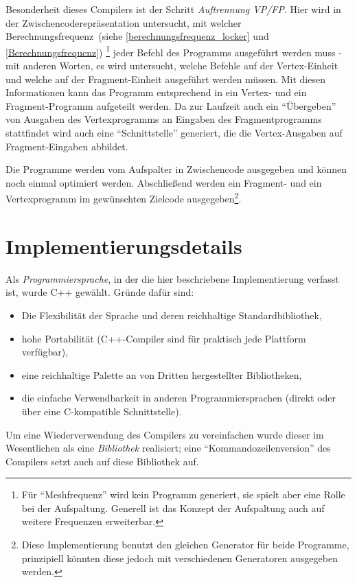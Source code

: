 \documentclass[twoside,a4paper,fleqn,12pt]{book}
\begin{document}
Besonderheit dieses Compilers ist der Schritt \emph{Auftrennung VP/FP}. Hier wird in der Zwischencoderepräsentation untersucht, mit
welcher Berechnungsfrequenz~(siehe \ref{berechnungsfrequenz_locker} und \ref{Berechnungsfrequenz})
\footnote{Für "`Meshfrequenz"' wird kein Programm generiert, sie spielt aber eine Rolle bei der Aufspaltung. Generell ist das Konzept der Aufspaltung auch auf weitere Frequenzen erweiterbar.}
jeder Befehl des Programms ausgeführt werden muss - mit anderen Worten,
es wird untersucht, welche Befehle auf der Vertex-Einheit und welche auf der Fragment-Einheit ausgeführt werden müssen. Mit diesen Informationen kann
das Programm entsprechend in ein Vertex- und ein Fragment-Programm aufgeteilt werden. Da zur Laufzeit auch ein "`Übergeben"' von Ausgaben
des Vertexprogramms an Eingaben des Fragmentprogramms stattfindet wird auch eine "`Schnittstelle"' generiert, die die Vertex-Ausgaben auf Fragment-Eingaben
abbildet.

Die Programme werden vom Aufspalter in Zwischencode ausgegeben und können noch einmal optimiert werden. %
Abschließend werden ein Fragment- und ein Vertexprogramm im gewünschten Zielcode ausgegeben\footnote{Diese Implementierung benutzt den
gleichen Generator für beide Programme, prinzipiell könnten diese jedoch mit verschiedenen Generatoren ausgegeben werden.}.

\section{Implementierungsdetails}

Als \emph{Programmiersprache}, in der die hier beschriebene Implementierung verfasst ist, wurde C++ gewählt.
Gründe dafür sind:
\begin{itemize}
\item Die Flexibilität der Sprache und deren reichhaltige Standardbibliothek,
\item hohe Portabilität (C++-Compiler sind für praktisch jede Plattform verfügbar),
\item eine reichhaltige Palette an von Dritten hergestellter Bibliotheken,
\item die einfache Verwendbarkeit in anderen Programmiersprachen (direkt oder über eine C-kompatible Schnittstelle).%
\end{itemize}
 
Um eine Wiederverwendung des Compilers zu vereinfachen wurde dieser im Wesentlichen als eine \emph{Bibliothek} realisiert;
eine "`Kommandozeilenversion"' des Compilers setzt auch auf diese Bibliothek auf.
 
\end{document}
